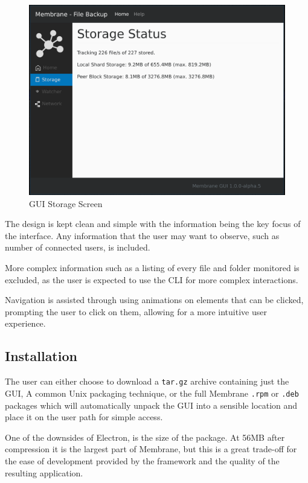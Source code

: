 \documentclass[11pt, a4paper, twoside]{report}
\def\code#1{\texttt{#1}}
\begin{document}
\begin{figure}
 \centering
 \includegraphics[width=\textwidth]{gui-storage}
 \caption{GUI Storage Screen}
 \label{fig:gui-storage}
\end{figure}

The design is kept clean and simple with the information being the key focus of the interface. Any information that the user may want to observe, such as number of connected users, is included.

More complex information such as a listing of every file and folder monitored is excluded, as the user is expected to use the CLI for more complex interactions.

Navigation is assisted through using animations on elements that can be clicked, prompting the user to click on them, allowing for a more intuitive user experience.

\subsection{Installation}

The user can either choose to download a \code{tar.gz} archive containing just the GUI, A common Unix packaging technique, or the full Membrane \code{.rpm} or \code{.deb} packages which will automatically unpack the GUI into a sensible location and place it on the user path for simple access.

One of the downsides of Electron, is the size of the package. At 56MB after compression it is the largest part of Membrane, but this is a great trade-off for the ease of development provided by the framework and the quality of the resulting application.
\end{document}
